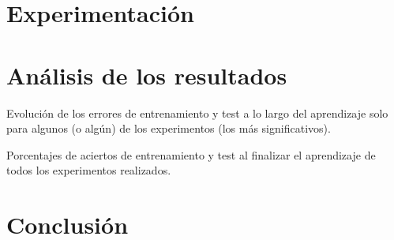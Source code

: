 \documentclass{uc3mpracticas}
\begin{document}
\section{Experimentación}

\section{Análisis de los resultados}

Evolución de los errores de entrenamiento y test a lo largo del aprendizaje solo para algunos (o algún) de los experimentos (los más significativos).


Porcentajes de aciertos de entrenamiento y test al finalizar el aprendizaje de todos los experimentos realizados.

\section{Conclusión}
\end{document}
